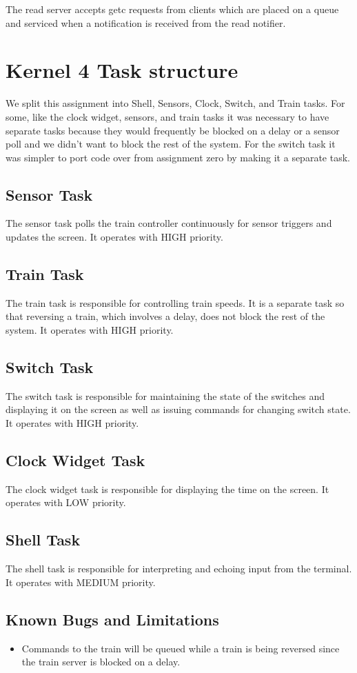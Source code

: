 \documentclass{article}
\begin{document}
The read server accepts getc requests from clients which are placed on a queue and serviced when a notification is received from the read notifier.

\section{Kernel 4 Task structure}

We split this assignment into Shell, Sensors, Clock, Switch, and Train tasks. For some, like the clock widget, sensors, and train tasks it was necessary to have separate tasks because they would frequently be blocked on a delay or a sensor poll and we didn't want to block the rest of the system. For the switch task it was simpler to port code over from assignment zero by making it a separate task.

\subsection{Sensor Task}
The sensor task polls the train controller continuously for sensor triggers and updates the screen. It operates with HIGH priority.

\subsection{Train Task}
The train task is responsible for controlling train speeds. It is a separate task so that reversing a train, which involves a delay, does not block the rest of the system. It operates with HIGH priority.

\subsection{Switch Task}
The switch task is responsible for maintaining the state of the switches and displaying it on the screen as well as issuing commands for changing switch state. It operates with HIGH priority.

\subsection{Clock Widget Task}
The clock widget task is responsible for displaying the time on the screen. It operates with LOW priority.

\subsection{Shell Task}
The shell task is responsible for interpreting and echoing input from the terminal. It operates with MEDIUM priority.

\subsection{Known Bugs and Limitations}
\begin{itemize}
\item Commands to the train will be queued while a train is being reversed since the train server is blocked on a delay.
\end{itemize}
\end{document}
